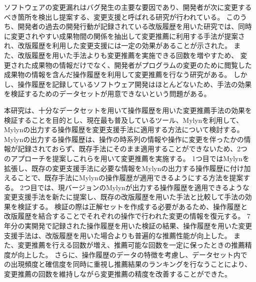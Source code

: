 ソフトウェアの変更漏れはバグ発生の主要な要因であり、開発者が次に変更するべき箇所を検出し提案する、変更支援と呼ばれる研究が行われている。
このうち、開発者の過去の開発行動が記録されている改版履歴を用いた研究では、同時に変更されやすい成果物間の関係を抽出して変更推薦に利用する手法が提案され、改版履歴を利用した変更支援には一定の効果があることが示された。
また、改版履歴を用いた手法よりも変更推薦を実施できる回数を増やすため、
変更された成果物の情報だけでなく、開発者がプログラムの変更のために閲覧した成果物の情報を含んだ操作履歴を利用して変更推薦を行なう研究がある。
しかし、操作履歴を記録しているソフトウェア開発はほとんどないため、手法の効果を検証するためのデータセットが用意できないという問題がある。

本研究は、十分なデータセットを用いて操作履歴を用いた変更推薦手法の効果を検証することを目的とし、現在最も普及しているツール、Mylynを利用して、Mylynの出力する操作履歴を変更支援手法に適用する方法について検討する。
Mylynの出力する操作履歴は、操作の時系列の情報や操作に変更を伴ったかの情報が記録されておらず、既存手法にそのまま適用することができないため、2つのアプローチを提案しこれらを用いて変更推薦を実施する。
1つ目ではMylynを拡張し、既存の変更支援手法に必要な情報をMylynの出力する操作履歴に付け加えることで、既存手法にMylynの操作履歴が適用できるようにする方法を提案する。
2つ目では、現バージョンのMylynが出力する操作履歴を適用できるような変更支援手法を新たに提案し、既存の改版履歴を用いた手法と比較して手法の効果を検証する。
検証の際は正解セットを作成する必要があるため、操作履歴と改版履歴を結合することでそれぞれの操作で行われた変更の情報を復元する。
7年分の実開発で記録された操作履歴を用いた検証の結果、操作履歴を用いた変更支援手法は、改版履歴を用いた場合よりも普遍的な推薦性能が向上した。
また、変更推薦を行える回数が増え、推薦可能な回数を一定に保ったときの推薦精度が向上した。
さらに、操作履歴のデータの特徴を考慮し、データセット内での出現頻度と確信度を同時に重視し推薦結果のランキングを行なうことにより、変更推薦の回数を維持しながら変更推薦の精度を改善することができた。


